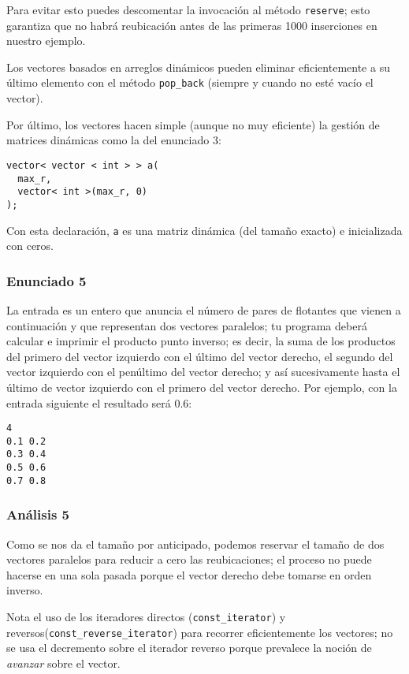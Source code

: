 \documentclass[10pt,letterpaper,twocolumn,spanish]{article}
\begin{document}
Para evitar esto puedes descomentar la invocación al método \texttt{reserve}; esto garantiza que no habrá reubicación antes de las primeras 1000 inserciones en nuestro ejemplo.

Los vectores basados en arreglos dinámicos pueden eliminar eficientemente a su último elemento con el método \texttt{pop\_back} (siempre y cuando no esté vacío el vector).

Por último, los vectores hacen simple (aunque no muy eficiente) la gestión de matrices dinámicas como la del enunciado 3:

\begin{verbatim}
vector< vector < int > > a(
  max_r,
  vector< int >(max_r, 0)
);
\end{verbatim}

Con esta declaración, \texttt{a} es una matriz dinámica (del tamaño exacto) e inicializada con ceros.

\subsubsection*{Enunciado 5}

La entrada es un entero que anuncia el número de pares de flotantes que vienen a continuación y que representan dos vectores paralelos; tu programa deberá calcular e imprimir el producto punto inverso; es decir, la suma de los productos del primero del vector izquierdo con el último del vector derecho, el segundo del vector izquierdo con el penúltimo del vector derecho; y así sucesivamente hasta el último de vector izquierdo con el primero del vector derecho. Por ejemplo, con la entrada siguiente el resultado será 0.6:

\begin{verbatim}
4
0.1 0.2
0.3 0.4
0.5 0.6
0.7 0.8
\end{verbatim}

\subsubsection*{Análisis 5}

Como se nos da el tamaño por anticipado, podemos reservar el tamaño de dos vectores paralelos para reducir a cero las reubicaciones; el proceso no puede hacerse en una sola pasada porque el vector derecho debe tomarse en orden inverso.

Nota el uso de los iteradores directos (\texttt{const\_iterator}) y reversos(\texttt{const\_reverse\_iterator}) para recorrer eficientemente los vectores; no se usa el decremento sobre el iterador reverso porque prevalece la noción de \textit{avanzar} sobre el vector.
\end{document}
